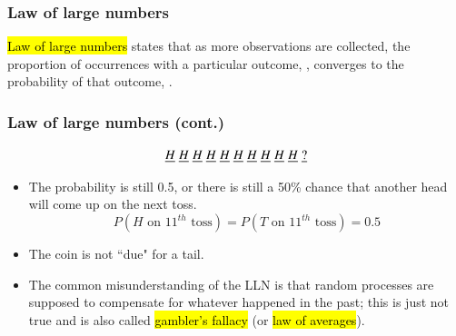 
\begin{frame}
\frametitle{Law of large numbers}

\hl{Law of large numbers} states that as more observations are collected, the proportion of occurrences with a particular outcome, , converges to the probability of that outcome, .

\end{frame}


\begin{frame}
\frametitle{Law of large numbers (cont.)}


\[ \underline{H} \hspace{1mm} \underline{H} \hspace{1mm} \underline{H} \hspace{1mm} \underline{H} \hspace{1mm} \underline{H} \hspace{1mm} \underline{H} \hspace{1mm} \underline{H} \hspace{1mm} \underline{H} \hspace{1mm} \underline{H} \hspace{1mm} \underline{H} \hspace{1mm} \underline{?} \]

\begin{itemize}
\item<2-> The probability is still 0.5, or there is still a 50\% chance that another head will come up on the next toss.
\[ P(H \text{ on 11}^{th} \text{ toss}) = P(T \text{ on 11}^{th} \text{ toss}) = 0.5 \]
\item<3-> The coin is not ``due" for a tail.
\item<4-> The common misunderstanding of the LLN is that random processes are supposed to compensate for whatever happened in the past; this is just not true and is also called \hl{gambler's fallacy} (or \hl{law of averages}).
\end{itemize}

\end{frame}


